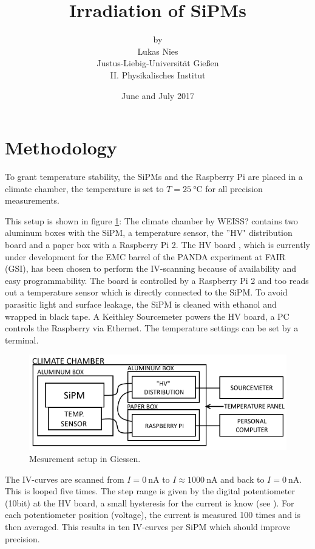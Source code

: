 \documentclass[12pt]{article}
\begin{document}
	
\title{
	\textbf{\huge{Irradiation of SiPMs}}}
\author{by \\ Lukas Nies \\ Justus-Liebig-Universit\"at Gie\ss{}en \\ II. Physikalisches Institut}
\date{June and July 2017 
}
\maketitle

\section{Methodology}

To grant temperature stability, the SiPMs and the Raspberry Pi are placed in a climate chamber, the temperature is set to $T=\SI{25}{\degreeCelsius}$ for all precision measurements. \par 
This setup is shown in figure \ref{fig1}: The climate chamber by WEISS? contains two aluminum boxes with the SiPM, a temperature sensor, the ''HV" distribution board and a paper box with a Raspberry Pi 2. The HV board \cite{HV_board}, which is currently under development for the EMC barrel of the PANDA experiment at FAIR (GSI), has been chosen to perform the IV-scanning because of availability and easy programmability. The board is controlled by a Raspberry Pi 2 and too reads out a temperature sensor which is directly connected to the SiPM. To avoid parasitic light and surface leakage, the SiPM is cleaned with ethanol and wrapped in black tape. A Keithley Sourcemeter powers the HV board, a PC controls the Raspberry via Ethernet. The temperature settings can be set by a terminal. \par 
\begin{figure}[b]
	\centering
	\includegraphics[width=0.85\linewidth]{./graphics/scheme_precision.png}
	\caption{Mesurement setup in Giessen.}
	\label{fig1}
\end{figure} 
The IV-curves are scanned from $I=\SI{0}{\nano\ampere}$ to $I\approx\SI{1000}{\nano\ampere}$ and back to $I=\SI{0}{\nano\ampere}$. This is looped five times. The step range is given by the digital potentiometer (10bit) at the HV board, a small hysteresis for the current is know (see \cite{HV_board}). For each potentiometer position (voltage), the current is measured 100 times and is then averaged. This results in ten IV-curves per SiPM which should improve precision.     
\end{document}
